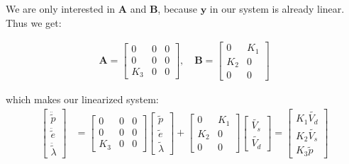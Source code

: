 We are only interested in $\mathbf{A}$ and $\mathbf{B}$, because $\mathbf{y}$ in our system is already linear. Thus we get:

\begin{equation}
    \begin{aligned}
        \mathbf{A} =
        \begin{bmatrix} 0 & 0 & 0 \\ 0 & 0 & 0 \\ K_{3} & 0 & 0 \end{bmatrix}, \quad
        \mathbf{B} = 
        \begin{bmatrix} 0 & K_{1} \\ K_{2} & 0 \\ 0 & 0 \end{bmatrix}
    \end{aligned}
\end{equation}

which makes our linearized system:
\begin{equation}\label{eq:model_final_sol}
    \begin{aligned}
        \begin{bmatrix} \ddot{\tilde{p}} \\ \ddot{\tilde{e}} \\ \ddot{\tilde{\lambda}} \end{bmatrix}
        &=
        \begin{bmatrix} 0 & 0 & 0 \\ 0 & 0 & 0 \\ K_{3} & 0 & 0 \end{bmatrix}
        \begin{bmatrix} \tilde{p} \\ \tilde{e} \\ \tilde{\lambda} \end{bmatrix}
        +
        \begin{bmatrix} 0 & K_{1} \\ K_{2} & 0 \\ 0 & 0 \end{bmatrix}
        \begin{bmatrix} \tilde{V_{s}} \\ \tilde{V_{d}} \end{bmatrix}
        = 
        \begin{bmatrix} K_{1} \tilde{V_{d}} \\ K_{2} \tilde{V_{s}} \\ K_{3} \tilde{p} \end{bmatrix} \\
    \end{aligned}
\end{equation}

